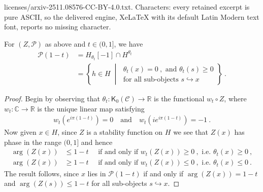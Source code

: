 \documentclass[10pt,a4paper]{amsart}
\newcommand{\C}{\mathbb{C}}
\newcommand{\R}{\mathbb{R}}
\newcommand{\calP}{\mathcal{P}}
\newcommand{\scrC}{\mathscr{C}}
\newcommand{\sfK}{\mathsf{K}}
\begin{document}
licenses/arxiv-2511.08576-CC-BY-4.0.txt. Characters: every retained excerpt is pure ASCII, so the delivered engine, XeLaTeX with its default Latin Modern text font, reports no missing character.
\begin{lemma}
    For $(Z,\calP)$ as above and $t\in (0,1]$, we have
    \begin{align}
        \calP(1-t)
        &= H_{\theta_t}[-1]\cap H^{\theta_t}\\
        &= \left\{
            h\in H \;\middle\vert\;
            \begin{array}{l}
                \theta_t(x)=0\ ,\text{ and }\theta_t(s)\geq 0\\[2pt]
                \text{for all sub-objects }s\hookrightarrow x
            \end{array}
        \right\}\ .
    \end{align}
\end{lemma}

\begin{proof}
	Begin by observing that $\theta_t\colon \sfK_0(\scrC)\to \R$ is the functional $w_t\circ Z$, where $w_t\colon \C\to \R$ is the unique linear map satisfying
	\begin{align}
		w_t(e^{i\pi(1-t)})=0\quad\text{and} \quad w_t(ie^{i\pi(1-t)})=-1\ .
	\end{align}
	Now given $x\in H $, since $Z$ is a stability function on $H$ we see that $Z(x)$ has phase in the range $(0,1]$ and hence
	\begin{align}
		\arg(Z(x)) &\leq 1-t \quad \text{ if and only if }
		w_t\left(Z(x)\right)\geq 0\ , \text{ i.e. } \theta_t(x)\geq 0\ ,
		\\
		\arg(Z(x)) &\geq 1-t \quad \text{ if and only if }
		w_t\left(Z(x)\right)\leq 0\ , \text{ i.e. } \theta_t(x)\leq 0\ .
	\end{align}
	The result follows, since $x$ lies in $\calP(1-t)$ if and only if $\arg(Z(x))=1-t$ and $\arg(Z(s))\leq 1-t$ for all sub-objects $s\hookrightarrow x$.
\end{proof}
\end{document}
